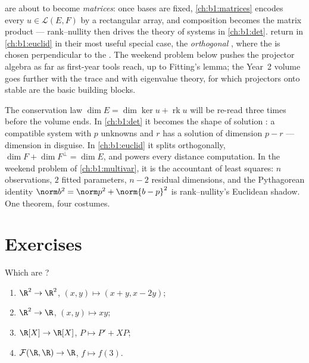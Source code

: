 \begin{remark}
\label{rem:b1:linmaps:whereused}
 are about to become \emph{matrices}: once bases are
fixed, \cref{ch:b1:matrices} encodes every $u \in \mathcal{L}(E,
F)$ by a rectangular array, and composition becomes the matrix
product --- rank--nullity then drives the theory of 
systems in \cref{ch:b1:det}.  return in
\cref{ch:b1:euclid} in their most useful special case, the
\emph{orthogonal} , where the  is chosen
perpendicular to the . The weekend problem below pushes the
projector algebra as far as first-year tools reach, up to
Fitting's lemma; the Year~2 volume goes further with the trace
and with eigenvalue theory, for which projectors onto stable
 are the basic building blocks.
\end{remark}

\begin{remark}
\label{rem:b1:linmaps:perspectives}
The conservation law $\dim E = \dim\ker u + \operatorname{rk} u$
will be re-read three times before the volume ends. In
\cref{ch:b1:det} it becomes the shape of solution : a
compatible system with $p$ unknowns and  $r$ has a solution
 of dimension $p - r$ ---  dimension in disguise. In
\cref{ch:b1:euclid} it splits orthogonally, $\dim F + \dim
F^\perp = \dim E$, and powers every distance computation. In
the weekend problem of \cref{ch:b1:multivar}, it is the
accountant of least squares: $n$ observations, $2$ fitted
parameters, $n - 2$ residual dimensions, and the Pythagorean
identity $\norm b^2 = \norm p^2 + \norm{b - p}^2$ is
rank--nullity's Euclidean shadow. One theorem, four costumes.
\end{remark}

\section{Exercises}

\begin{exercise}[$\star$]\label{exo:b1:linmaps:1}
Which  are ?
\begin{enumerate}
  \item $\R^2 \to \R^2$, $(x, y) \mapsto (x + y, x - 2y)$;
  \item $\R^2 \to \R$, $(x, y) \mapsto xy$;
  \item $\R[X] \to \R[X]$, $P \mapsto P' + XP$;
  \item $\mathcal{F}(\R,\R) \to \R$, $f \mapsto f(3)$.
\end{enumerate}
\end{exercise}

